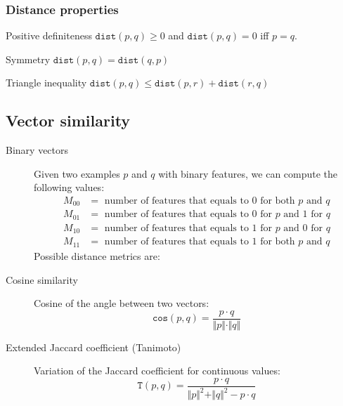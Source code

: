 \subsubsection{Distance properties}
\begin{descriptionlist}
    \item[Positive definiteness] 
        $\texttt{dist}(p, q) \geq 0$ and $\texttt{dist}(p, q) = 0$ iff $p = q$.
    \item[Symmetry] 
        $\texttt{dist}(p, q) = \texttt{dist}(q, p)$
    \item[Triangle inequality] 
        $\texttt{dist}(p, q) \leq \texttt{dist}(p, r) + \texttt{dist}(r, q)$
\end{descriptionlist}



\subsection{Vector similarity}

\begin{description}
    \item[Binary vectors]
        Given two examples $p$ and $q$ with binary features, we can compute the following values:
        \[ 
            \begin{split}
                M_{00} &= \text{ number of features that equals to 0 for both $p$ and $q$} \\
                M_{01} &= \text{ number of features that equals to 0 for $p$ and 1 for $q$} \\
                M_{10} &= \text{ number of features that equals to 1 for $p$ and 0 for $q$} \\
                M_{11} &= \text{ number of features that equals to 1 for both $p$ and $q$}
            \end{split}    
        \]
        Possible distance metrics are:

    \item[Cosine similarity] 
        Cosine of the angle between two vectors:
        \[ \texttt{cos}(p, q) = \frac{p \cdot q}{\Vert p \Vert \cdot \Vert q \Vert} \]

    \item[Extended Jaccard coefficient (Tanimoto)] 
        Variation of the Jaccard coefficient for continuous values:
        \[ \texttt{T}(p, q) = \frac{p \cdot q}{\Vert p \Vert^2 + \Vert q \Vert^2 - p \cdot q} \]
\end{description}


